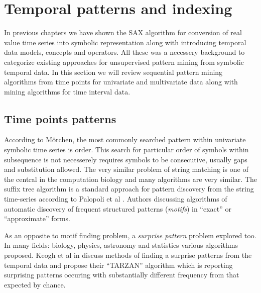 \section{Temporal patterns and indexing} \label{tpatterns}
In previous chapters we have shown the SAX algorithm for conversion of real value time series into symbolic representation along with introducing temporal data models, concepts and operators. All these was a necessery background to categorize existing approaches for unsupervised pattern mining from symbolic temporal data. In this section we will review sequential pattern mining algorithms from time points for univariate and multivariate data along with mining algorithms for time interval data.

\subsection{Time points patterns}
According to M\"orchen, the most commonly searched pattern within univariate symbolic time series is order. This search for particular order of symbols within subsequence is not necesserely requires symbols to be consecutive, usually gaps and substitution allowed. The very similar problem of string matching is one of the central in the computation biology \cite{citeulike:465665} and many algorithms are very similar. The suffix tree algorithm is a standard approach for pattern discovery from the string time-series according to Palopoli et al \cite{citeulike:5003338}. Authors discussing algorithms of automatic discovery of frequent structured patterns (\textit{motifs}) in ``exact'' or ``approximate'' forms. 

As an opposite to motif finding problem, a \textit{surprise pattern} problem explored too. In many fields: biology, physics, astronomy and statistics various algorithms proposed. Keogh et al in \cite{citeulike:3025877} discuss methods of finding a surprise patterns from the temporal data and propose their ``TARZAN'' algorithm which is reporting surprising patterns occuring with substantially different frequency from that expected by chance.